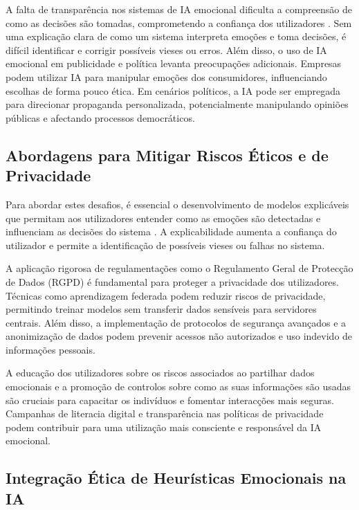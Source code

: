 \documentclass[a4paper,12pt]{report}
\begin{document}
	A falta de transparência nos sistemas de IA emocional dificulta a compreensão de como as decisões são tomadas, comprometendo a confiança dos utilizadores \parencite{russell2020}. Sem uma explicação clara de como um sistema interpreta emoções e toma decisões, é difícil identificar e corrigir possíveis vieses ou erros. Além disso, o uso de IA emocional em publicidade e política levanta preocupações adicionais. Empresas podem utilizar IA para manipular emoções dos consumidores, influenciando escolhas de forma pouco ética. Em cenários políticos, a IA pode ser empregada para direcionar propaganda personalizada, potencialmente manipulando opiniões públicas e afectando processos democráticos.
	
	\subsection{Abordagens para Mitigar Riscos Éticos e de Privacidade}
	
	Para abordar estes desafios, é essencial o desenvolvimento de modelos explicáveis que permitam aos utilizadores entender como as emoções são detectadas e influenciam as decisões do sistema \parencite{russell2020}. A explicabilidade aumenta a confiança do utilizador e permite a identificação de possíveis vieses ou falhas no sistema.
	
	A aplicação rigorosa de regulamentações como o Regulamento Geral de Protecção de Dados (RGPD) é fundamental para proteger a privacidade dos utilizadores. Técnicas como aprendizagem federada podem reduzir riscos de privacidade, permitindo treinar modelos sem transferir dados sensíveis para servidores centrais. Além disso, a implementação de protocolos de segurança avançados e a anonimização de dados podem prevenir acessos não autorizados e uso indevido de informações pessoais.
	
	A educação dos utilizadores sobre os riscos associados ao partilhar dados emocionais e a promoção de controlos sobre como as suas informações são usadas são cruciais para capacitar os indivíduos e fomentar interacções mais seguras. Campanhas de literacia digital e transparência nas políticas de privacidade podem contribuir para uma utilização mais consciente e responsável da IA emocional.
	
	\subsection{Integração Ética de Heurísticas Emocionais na IA}
	
\end{document}
